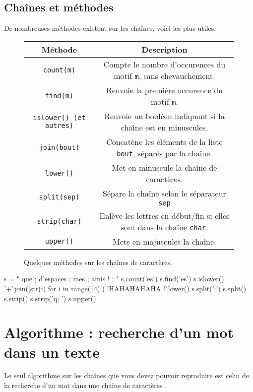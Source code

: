 \subsection{Chaînes et méthodes}
De nombreuses méthodes existent sur les chaînes, voici les plus utiles.
\begin{figure}[!h]
  \begin{center}
    \begin{tabular}{|c|c|}
      \hline
      Méthode & Description \\
      \hline
      \texttt{count(m)}& Compte le nombre d'occurences du motif \texttt{m}, sans chevauchement.\\
      \hline
      \texttt{find(m)}& Renvoie la première occurence du motif \texttt{m}.\\
      \hline
      \texttt{islower() (et autres)}& Renvoie un booléen indiquant si la chaîne est en minuscules. \\
      \hline
      \texttt{join(bout)}& Concatène les éléments de la liste \texttt{bout}, séparés par la chaîne.\\
      \hline
      \texttt{lower()}& Met en minuscule la chaîne de caractères.\\
      \hline
      \texttt{split(sep)}& Sépare la chaîne selon le séparateur \texttt{sep}\\
      \hline      
      \texttt{strip(char)}& Enlève les lettres en début/fin si elles sont dans la chaîne \texttt{char}.\\
      \hline
      \texttt{upper()}& Mets en majuscules la chaîne.  \\
      \hline
    \end{tabular}
    \caption{Quelques méthodes sur les chaînes de caractères.}
    \label{tab.str.methodes}
  \end{center}
\end{figure}

\begin{pyconsole}
s = "    que ; d'espaces ; mes ; amis ! ;   "
s.count('es')
s.find('es')
s.islower()
'+'.join([str(i) for i in range(14)])
'HAHAHAHAHA !'.lower()
s.split(';')
s.split()
s.strip()
s.strip('q; ')
s.upper()
\end{pyconsole}

\section{Algorithme : recherche d'un mot dans un texte}

Le seul algorithme sur les chaînes que vous devez pouvoir reproduire est celui de la recherche d'un mot  dans une chaîne de caractères .


